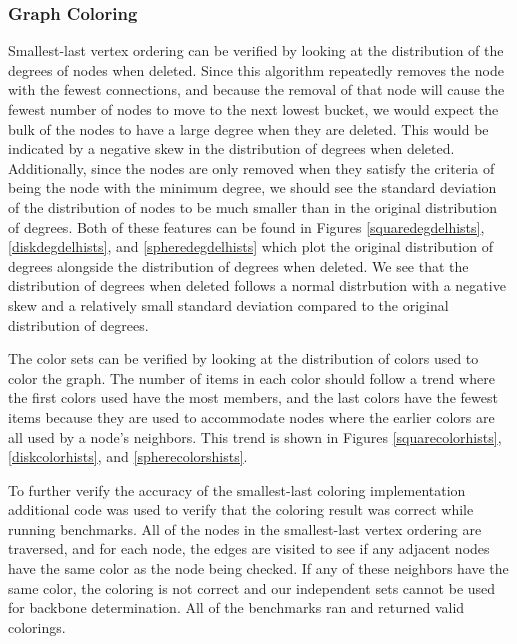 \documentclass{article}
\begin{document}
        \subsubsection{Graph Coloring}
        Smallest-last vertex ordering can be verified by looking at the distribution of the degrees of nodes when deleted. Since this algorithm repeatedly removes the node with the fewest connections, and because the removal of that node will cause the fewest number of nodes to move to the next lowest bucket, we would expect the bulk of the nodes to have a large degree when they are deleted. This would be indicated by a negative skew in the distribution of degrees when deleted. Additionally, since the nodes are only removed when they satisfy the criteria of being the node with the minimum degree, we should see the standard deviation of the distribution of nodes to be much smaller than in the original distribution of degrees. Both of these features can be found in Figures \ref{squaredegdelhists}, \ref{diskdegdelhists}, and \ref{spheredegdelhists} which plot the original distribution of degrees alongside the distribution of degrees when deleted. We see that the distribution of degrees when deleted follows a normal distrbution with a negative skew and a relatively small standard deviation compared to the original distribution of degrees.
        \par
        The color sets can be verified by looking at the distribution of colors used to color the graph. The number of items in each color should follow a trend where the first colors used have the most members, and the last colors have the fewest items because they are used to accommodate nodes where the earlier colors are all used by a node's neighbors. This trend is shown in Figures \ref{squarecolorhists}, \ref{diskcolorhists}, and \ref{spherecolorshists}.
        \par
        To further verify the accuracy of the smallest-last coloring implementation additional code was used to verify that the coloring result was correct while running benchmarks. All of the nodes in the smallest-last vertex ordering are traversed, and for each node, the edges are visited to see if any adjacent nodes have the same color as the node being checked. If any of these neighbors have the same color, the coloring is not correct and our independent sets cannot be used for backbone determination. All of the benchmarks ran and returned valid colorings.

\end{document}
